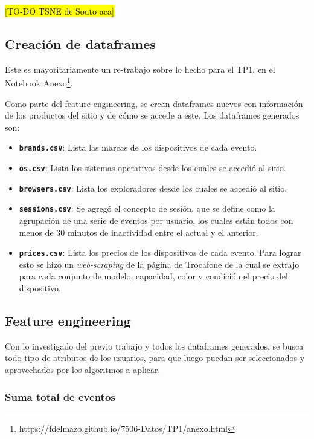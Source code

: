 \documentclass[a4paper]{article}
\begin{document}
\hl{[TO-DO TSNE de Souto aca]}

\subsection{Creación de dataframes}

Este es mayoritariamente un re-trabajo sobre lo hecho para el TP1, en el Notebook Anexo\footnote{https://fdelmazo.github.io/7506-Datos/TP1/anexo.html}.

Como parte del feature engineering, se crean dataframes nuevos con información de los productos del sitio y de cómo se accede a este. Los dataframes generados son:

\begin{itemize}
	\item \textbf{\texttt{brands.csv}}: Lista las marcas de los dispositivos de cada evento.
	\item \textbf{\texttt{os.csv}}: Lista los sistemas operativos desde los cuales se accedió al sitio.
	\item \textbf{\texttt{browsers.csv}}: Lista los exploradores desde los cuales se accedió al sitio.
	\item \textbf{\texttt{sessions.csv}}:  Se agregó el concepto de sesión, que se define como la agrupación de una serie de eventos por usuario, los cuales están todos con menos de 30 minutos de inactividad entre el actual y el anterior. 
	\item \textbf{\texttt{prices.csv}}: Lista los precios de los dispositivos de cada evento. Para lograr esto se hizo un \textit{web-scraping} de la página de Trocafone de la cual se extrajo para cada conjunto de modelo, capacidad, color y condición el precio del dispositivo.
\end{itemize}

\subsection{Feature engineering}

Con lo investigado del previo trabajo y todos los dataframes generados, se busca todo tipo de atributos de los usuarios, para que luego puedan ser seleccionados y aprovechados por los algoritmos a aplicar.

\subsubsection{Suma total de eventos}

\begin{sloppypar}
\texttt{}
\end{sloppypar}
\end{document}

